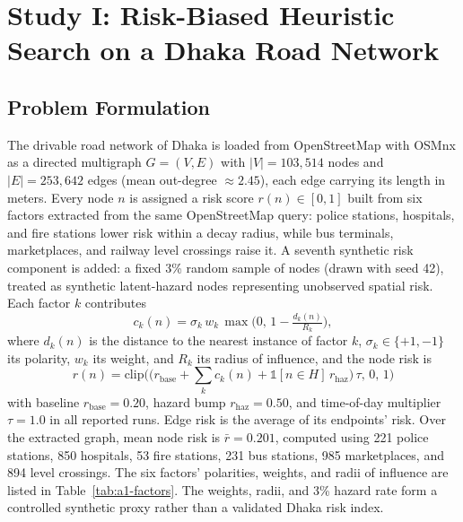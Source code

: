 \documentclass{ai-lab-report}
\begin{document}
\section{Study I: Risk-Biased Heuristic Search on a Dhaka Road Network}

\subsection{Problem Formulation}
The drivable road network of Dhaka is loaded from OpenStreetMap with OSMnx \citep{boeing2017osmnx} as a directed multigraph $G=(V,E)$ with $|V|=103{,}514$ nodes and $|E|=253{,}642$ edges (mean out-degree $\approx 2.45$), each edge carrying its length in meters. Every node $n$ is assigned a risk score $r(n)\in[0,1]$ built from six factors extracted from the same OpenStreetMap query: police stations, hospitals, and fire stations lower risk within a decay radius, while bus terminals, marketplaces, and railway level crossings raise it. A seventh synthetic risk component is added: a fixed 3\% random sample of nodes (drawn with seed 42), treated as synthetic latent-hazard nodes representing unobserved spatial risk. Each factor $k$ contributes
\begin{equation}
c_k(n) = \sigma_k\, w_k\, \max\!\Big(0,\, 1-\tfrac{d_k(n)}{R_k}\Big),
\label{eq:a1-risk-factor}
\end{equation}
where $d_k(n)$ is the distance to the nearest instance of factor $k$, $\sigma_k\in\{+1,-1\}$ its polarity, $w_k$ its weight, and $R_k$ its radius of influence, and the node risk is
\begin{equation}
r(n)=\mathrm{clip}\Big(\big(r_{\text{base}} + \textstyle\sum_k c_k(n) + \mathbb{1}[n\in H]\,r_{\text{haz}}\big)\,\tau,\,0,\,1\Big)
\label{eq:a1-risk-score}
\end{equation}
with baseline $r_{\text{base}}=0.20$, hazard bump $r_{\text{haz}}=0.50$, and time-of-day multiplier $\tau=1.0$ in all reported runs. Edge risk is the average of its endpoints' risk. Over the extracted graph, mean node risk is $\bar r = 0.201$, computed using 221 police stations, 850 hospitals, 53 fire stations, 231 bus stations, 985 marketplaces, and 894 level crossings. The six factors' polarities, weights, and radii of influence are listed in Table~\ref{tab:a1-factors}. The weights, radii, and 3\% hazard rate form a controlled synthetic proxy rather than a validated Dhaka risk index.
\end{document}
